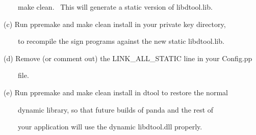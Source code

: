 \documentclass[a4paper]{article}
\begin{document}
{\color{black}
\ \ \ \ make clean. \ This will generate a static version of libdtool.lib.}


\bigskip

{\color{black}
(c) Run ppremake and make clean install in your private key directory,}

{\color{black}
\ \ \ \ to recompile the sign programs against the new static libdtool.lib.}


\bigskip

{\color{black}
(d) Remove (or comment out) the LINK\_ALL\_STATIC line in your Config.pp}

{\color{black}
\ \ \ \ file.}


\bigskip

{\color{black}
(e) Run ppremake and make clean install in dtool to restore the normal}

{\color{black}
\ \ \ \ dynamic library, so that future builds of panda and the rest of}

{\color{black}
\ \ \ \ your application will use the dynamic libdtool.dll properly.}

\clearpage
\bigskip
\end{document}
